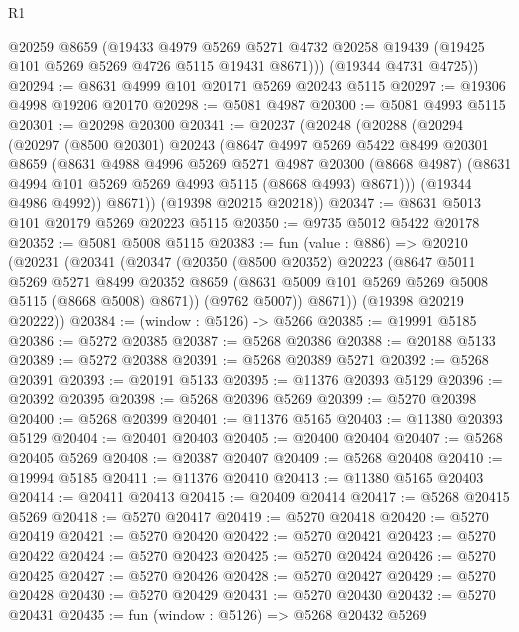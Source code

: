 \begin{lexlean}{R1}
\begin{coremodule}
        @20259
        @8659
        (@19433
          @4979
          @5269
          @5271
          @4732
          @20258
          @19439
          (@19425 @101 @5269 @5269 @4726 @5115 @19431 @8671)))
      (@19344 @4731 @4725))
@20294 := @8631 @4999 @101 @20171 @5269 @20243 @5115
@20297 := @19306 @4998 @19206 @20170
@20298 := @5081 @4987
@20300 := @5081 @4993 @5115
@20301 := @20298 @20300
@20341 := @20237
    (@20248
      (@20288
        (@20294
          (@20297
            (@8500 @20301)
            @20243
            (@8647
              @4997
              @5269
              @5422
              @8499
              @20301
              @8659
              (@8631
                @4988
                @4996
                @5269
                @5271
                @4987
                @20300
                (@8668 @4987)
                (@8631 @4994 @101 @5269 @5269 @4993 @5115 (@8668 @4993) @8671)))
            (@19344 @4986 @4992))
          @8671))
      (@19398 @20215 @20218))
@20347 := @8631 @5013 @101 @20179 @5269 @20223 @5115
@20350 := @9735 @5012 @5422 @20178
@20352 := @5081 @5008 @5115
@20383 := fun (value : @886) =>
  @20210
    (@20231
      (@20341
        (@20347
          (@20350
            (@8500 @20352)
            @20223
            (@8647
              @5011
              @5269
              @5271
              @8499
              @20352
              @8659
              (@8631 @5009 @101 @5269 @5269 @5008 @5115 (@8668 @5008) @8671))
            (@9762 @5007))
          @8671))
      (@19398 @20219 @20222))
@20384 := (window : @5126) -> @5266
@20385 := @19991 @5185
@20386 := @5272 @20385
@20387 := @5268 @20386
@20388 := @20188 @5133
@20389 := @5272 @20388
@20391 := @5268 @20389 @5271
@20392 := @5268 @20391
@20393 := @20191 @5133
@20395 := @11376 @20393 @5129
@20396 := @20392 @20395
@20398 := @5268 @20396 @5269
@20399 := @5270 @20398
@20400 := @5268 @20399
@20401 := @11376 @5165
@20403 := @11380 @20393 @5129
@20404 := @20401 @20403
@20405 := @20400 @20404
@20407 := @5268 @20405 @5269
@20408 := @20387 @20407
@20409 := @5268 @20408
@20410 := @19994 @5185
@20411 := @11376 @20410
@20413 := @11380 @5165 @20403
@20414 := @20411 @20413
@20415 := @20409 @20414
@20417 := @5268 @20415 @5269
@20418 := @5270 @20417
@20419 := @5270 @20418
@20420 := @5270 @20419
@20421 := @5270 @20420
@20422 := @5270 @20421
@20423 := @5270 @20422
@20424 := @5270 @20423
@20425 := @5270 @20424
@20426 := @5270 @20425
@20427 := @5270 @20426
@20428 := @5270 @20427
@20429 := @5270 @20428
@20430 := @5270 @20429
@20431 := @5270 @20430
@20432 := @5270 @20431
@20435 := fun (window : @5126) => @5268 @20432 @5269

\end{coremodule}
\end{lexlean}
